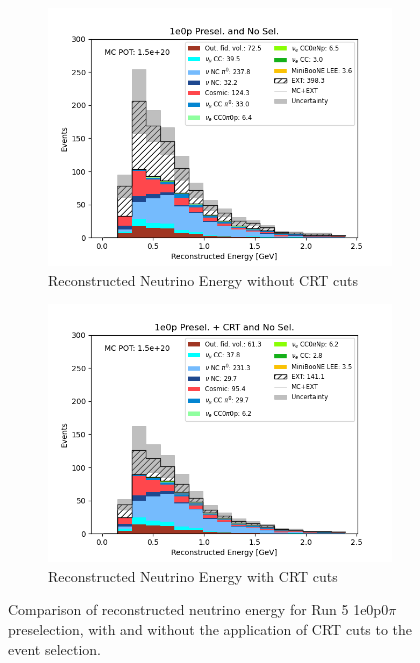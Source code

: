 \begin{figure}[H] \centering
    \begin{subfigure}[t]{0.45\linewidth}
        \includegraphics[width=\linewidth]{technote/EventSelections/FiguresCRT/0Ppresel.png}
        \caption{Reconstructed Neutrino Energy without CRT cuts}
    \end{subfigure}%
    \hspace{0.45cm}%
    \begin{subfigure}[t]{0.45\linewidth}
        \includegraphics[width=\linewidth]{technote/EventSelections/FiguresCRT/0PpreselCRT.png}%
        \caption{Reconstructed Neutrino Energy with CRT cuts}
    \end{subfigure}%
    \caption{Comparison of reconstructed neutrino energy for Run 5 1e0p0$\pi$ preselection, with and without the application of CRT cuts to the event selection.}
    \label{fig:1e0p_preselection}
\end{figure}

